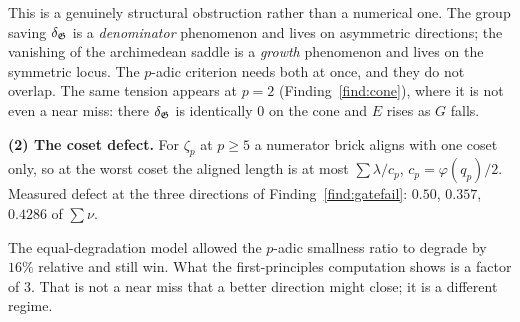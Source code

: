 \begin{center}\end{center}

This is a genuinely structural obstruction rather than a numerical one. The group saving
$\delta_{\mathfrak{G}}$ is a \emph{denominator} phenomenon and lives on asymmetric directions; the vanishing
of the archimedean saddle is a \emph{growth} phenomenon and lives on the symmetric locus.
The $p$-adic criterion needs both at once, and they do not overlap. The same tension appears
at $p=2$ (Finding~\ref{find:cone}), where it is not even a near miss: there $\delta_{\mathfrak{G}}$ is
identically $0$ on the cone and $E$ rises as $G$ falls.

\smallskip\noindent\textbf{(2) The coset defect.} For $\zeta_p$ at $p\ge5$ a numerator brick
aligns with one coset only, so at the worst coset the aligned length is at most
$\sum\lambda/c_p$, $c_p=\varphi(q_p)/2$. Measured defect at the three directions of
Finding~\ref{find:gatefail}: $0.50$, $0.357$, $0.4286$ of $\sum\nu$.

\begin{remark}\label{rem:whatwouldhave}
The equal-degradation model allowed the $p$-adic smallness ratio to degrade by $16\%$
relative and still win. What the first-principles computation shows is a factor of $3$. That
is not a near miss that a better direction might close; it is a different regime.
\end{remark}

